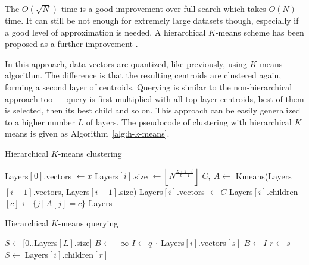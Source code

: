 
The $O(\sqrt{N})$ time is a good improvement over full search which 
takes $O(N)$ time. It can still be not enough for extremely large datasets
though, especially if a good level of approximation is needed. A hierarchical
$K$-means scheme has been proposed as a further improvement \cite{kmeans}.

In this approach, data vectors are quantized, like previously,
using $K$-means algorithm.
The difference is that the resulting centroids are clustered again, forming
a second layer of centroids. Querying is similar to the non-hierarchical
approach too --- query is first multiplied with all top-layer centroids,
best of them is selected, then its best child and
so on. This approach can be easily generalized to a higher number $L$  of layers.
The pseudocode of clustering with hierarchical $K$ means is given as Algorithm~\ref{alg:h-k-means}.

\begin{algorithm}
	\caption{Hierarchical $K$-means clustering}
	\begin{algorithmic}
		\State Layers$[0]$.vectors $\gets x $
			\State Layers$[i]$.size $\gets \left \lfloor N^{\frac{L + 1 - i}{L + 1}} \right \rfloor $
			\State $ C,\ A \gets$ Kmeans(Layers$[i - 1]$.vectors, Layers$[i - 1]$.size)
			\State Layers$[i]$.vectors $\gets C$
				\State Layers$[i]$.children$[c] \gets \{ j\ |\ A[j] = c \} $
			\EndFor
		\EndFor
		\State \Return Layers
	\end{algorithmic}
\label{alg:h-k-means}
\end{algorithm}

\begin{algorithm}
	\caption{Hierarchical $K$-means querying}
	\begin{algorithmic}
		\State $ S \gets [0..$Layers$[L].$size$]$
		\For{$ i = L,\dots,0 $}
			\State $ B \gets -\infty $
			\For{$ s \in S $}
				\State $ I \gets q\ \cdot\ $Layers$[i]$.vectors$[s]$
				\If{$ I > B $}
					\State $ B \gets I $
					\State $ r \gets s $
				\EndIf
			\EndFor
			\If{$ i = 0 $}
				\State \Return {$ r $}
			\EndIf
			\State $ S \gets\ $Layers$[i].$children$[r]$
		\EndFor
	\end{algorithmic}
\end{algorithm}

